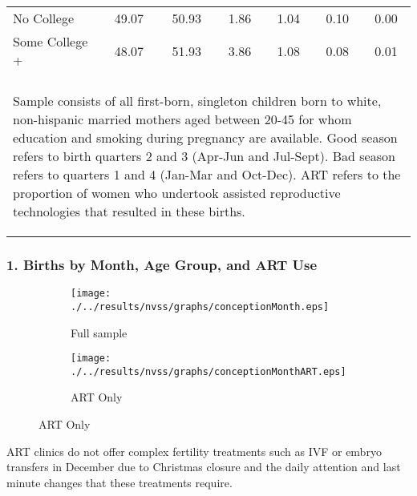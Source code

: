 \documentclass[10pt,letterpaper,subeqn]{beamer}
\begin{document}
\begin{frame}
\begin{table}[htpb!]
\begin{center}
{\begin{tabular}{lcccccc}
No College&49.07&50.93&1.86&1.04&0.10&0.00
\\
Some College +&48.07&51.93&3.86&1.08&0.08&0.01
\\
 &&&&&& \\
\midrule\multicolumn{7}{p{11.4cm}}{\begin{footnotesize}Sample consists of all first-born, singleton children born to white, non-hispanic married mothers aged between 20-45 for whom     education and smoking during pregnancy are available. Good season refers to birth quarters 2 and 3 (Apr-Jun and Jul-Sept).  Bad season refers to quarters 1 and 4 (Jan-Mar and Oct-Dec). ART refers to the proportion of  women who undertook assisted reproductive technologies that resulted in these births.
\end{footnotesize}} \\ \bottomrule
 \end{tabular}}\end{center}\end{table}
\end{frame}



\begin{frame}
\frametitle{1. Births by Month, Age Group, and ART Use}
\begin{figure}[htpb!]
\begin{center}
\caption{Birth Prevalence by Month, Age Group, and ART Usage}
\label{bqFig:concepMonth}
\begin{subfigure}{.5\textwidth}
  \centering
  \texttt{[image: ./../results/nvss/graphs/conceptionMonth.eps]}
  \caption{Full sample}
  \label{fig:concepAbs}
\end{subfigure}%
\begin{subfigure}{.5\textwidth}
  \centering
  \texttt{[image: ./../results/nvss/graphs/conceptionMonthART.eps]}
  \caption{ART Only}
  \label{fig:concepAbsART}
\end{subfigure}
\end{center}
\end{figure}
ART clinics do not offer complex fertility treatments such as IVF or embryo transfers in December due to Christmas closure and the daily attention and last minute changes that these treatments require.
\end{frame}
\end{document}
